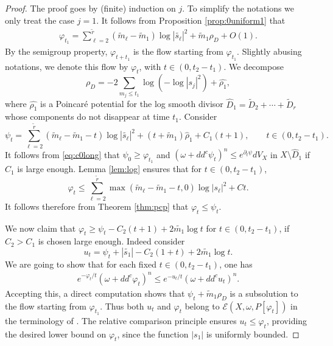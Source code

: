 \documentclass[10pt,a4paper]{amsart}
\numberwithin{equation}{section}
\newcommand{\f}{\varphi}
\newcommand{\p}{\psi}
\begin{document}
\begin{proof}
The proof goes by (finite) induction on $j$. To simplify the notations we only 
treat the case $j=1$. It follows from Proposition \ref{prop:0uniform1} that
\begin{eqnarray} \label{eq:c0long}
\f_{t_1}=\sum_{\ell=2}^{\tilde{r}} (\tilde{m}_{\ell}-\tilde{m}_{1}) \log |\tilde{s_\ell}|^2 +\tilde{m}_{1} {\rho}_D+O(1).
\end{eqnarray}
By the semigroup property, $\varphi_{t+t_1}$ is the flow starting from $\varphi_{t_1}$. Slightly abusing notations, 
we denote this flow by $\varphi_t$, with $t\in (0, t_2-t_1)$.
We decompose 
\[
{\rho}_D=-2 \sum_{m_j \leq t_1} \log (-\log |s_j|^2)+\hat{\rho_1},
\]
where
$\hat{\rho_1}$ is a Poincaré potential for the log smooth divisor 
$\hat{D}_1=\tilde{D}_{2} + \cdots + \tilde{D}_r$ 
whose components do not disappear at time $t_1$.
Consider
$$
\p_t=\sum_{\ell=2}^{\tilde{r}} (\tilde{m}_{\ell}-\tilde{m}_{1}-t) \log |\tilde{s_\ell}|^2 +(t+\tilde{m}_{1}) \hat{\rho}_1+C_1(t+1),  \qquad  t\in(0, t_2-t_1).
$$
It follows from \eqref{eq:c0long} that $\p_{0} \geq \f_{t_1}$
and $(\omega+dd^c \p_t)^n \leq e^{\partial_t \p} dV_X$ in $X \setminus \hat{D}_1$ if $C_1$ is large enough.
Lemma \ref{lem:log} ensures that for $t\in (0, t_2-t_1)$, 
\[
\varphi_t\leq \sum_{\ell=2}^{\tilde{r}} \max(\tilde{m}_\ell- \tilde{m}_1- t,0) \log |s_\ell|^2 +Ct.
\]
It follows therefore from Theorem \ref{thm:pcp} that $\f_t \leq \p_t$.

\smallskip

We now claim that 
$\f_t  \geq \p_t-C_2 (t+1)+2\tilde{m_1} \log t$
for $t \in (0,t_2-t_1)$, if $C_2>C_1$ is chosen large enough. Indeed consider 
$$
u_t=\p_t+|\tilde{s_1}|-C_2(1+t)+2\tilde{m_1} \log t.
$$
We are going to show that for each fixed $t \in (0,t_2-t_1)$, one has
\begin{eqnarray} \label{eq:MAelliptic}
e^{-{\f_t}/{t}}(\omega+dd^c \f_t)^n \leq e^{-{u_t}/{t}}(\omega+dd^c u_t)^n.
\end{eqnarray}
Accepting this, a direct computation shows that $\psi_t + \tilde{m}_1\rho_D$ is a subsolution to the flow starting from $\varphi_{t_1}$. Thus both $u_t$ and $\varphi_t$ belong to $ \mathcal{E}(X, \omega, P[\varphi_t])$ in the terminology of \cite{DDL2}. 
The relative comparison principle \cite[Corollary 3.6]{DDL2}  ensures  $u_t \leq \f_t$, 
providing the desired lower bound on $\f_t$, since the function $|s_1|$ is uniformly bounded.

\smallskip


\end{proof}
\end{document}
